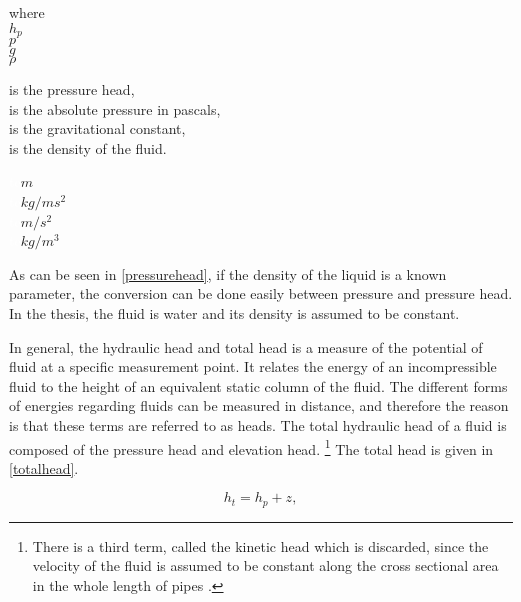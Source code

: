 \begin{minipage}[t]{0.20\textwidth}
where\\
\hspace*{8mm} $h_p$ \\
\hspace*{8mm} $p$ \\
\hspace*{8mm} $g$ \\
\hspace*{8mm} $\rho$ 
\end{minipage}
\begin{minipage}[t]{0.63\textwidth}
\vspace*{2mm}
is the pressure head,\\
is the absolute pressure in pascals, \\
is the gravitational constant, \\
is the density of the fluid.
\end{minipage}
\begin{minipage}[t]{0.15\textwidth}
\vspace*{2mm}
\textcolor{White}{te}$\unit{m}$\\
\textcolor{White}{te}$\unit{kg/ms^2}$\\
\textcolor{White}{te}$\unit{m/s^2}$\\
\textcolor{White}{te}$\unit{kg/m^3}$
\end{minipage}

As can be seen in \eqref{pressurehead}, if the density of the liquid is a known parameter, the conversion can be done easily between pressure and pressure head. In the thesis, the fluid is water and its density is assumed to be constant. 

In general, the hydraulic head and total head is a measure of the potential of fluid at a specific measurement point. It relates the energy of an incompressible fluid to the height of an equivalent static column of the fluid. The different forms of energies regarding fluids can be measured in distance, and therefore the reason is that these terms are referred to as heads. The total hydraulic head of a fluid is composed of the pressure head and elevation head. \footnote{There is a third term, called the kinetic head which is discarded, since the velocity of the fluid is assumed to be constant along the cross sectional area in the whole length of pipes \cite{chen2016sustainable}.} The total head is given in \eqref{totalhead}.

\begin{equation}
\label{totalhead}
  h_t = h_p + z,
\end{equation}


